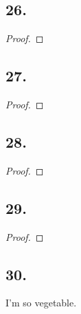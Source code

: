 \documentclass{report}
\begin{document}
            \subsection*{26.}
                \begin{proof}

                \end{proof}
            \subsection*{27.}
                \begin{proof}

                \end{proof}
            \subsection*{28.}
                \begin{proof}

                \end{proof}
            \subsection*{29.}
                \begin{proof}

                \end{proof}
            \subsection*{30.}
                I'm so vegetable.
\end{document}
